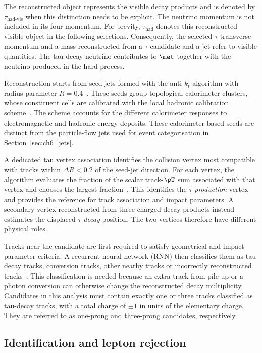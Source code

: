 The reconstructed object represents the visible decay products and is denoted by $\tau_{\mathrm{had\text{-}vis}}$ when this distinction needs to be explicit.
The neutrino momentum is not included in its four-momentum.
For brevity, $\tau_{\mathrm{had}}$ denotes this reconstructed visible object in the following selections.
Consequently, the selected $\tau$ transverse momentum and a mass reconstructed from a $\tau$ candidate and a jet refer to visible quantities.
The tau-decay neutrino contributes to $\met$ together with the neutrino produced in the hard process.

Reconstruction starts from seed jets formed with the anti-$k_t$ algorithm with radius parameter $R=0.4$~\cite{Cacciari2008AntiKt,ATLAS2022TauR22}.
These seeds group topological calorimeter clusters, whose constituent cells are calibrated with the local hadronic calibration scheme~\cite{ATLAS2017TopoClusters}.
The scheme accounts for the different calorimeter responses to electromagnetic and hadronic energy deposits.
These calorimeter-based seeds are distinct from the particle-flow jets used for event categorisation in Section~\ref{sec:ch6_jets}.

A dedicated tau vertex association identifies the collision vertex most compatible with tracks within $\Delta R<0.2$ of the seed-jet direction.
For each vertex, the algorithm evaluates the fraction of the scalar track-$\pT$ sum associated with that vertex and chooses the largest fraction~\cite{ATLAS2022TauR22}.
This identifies the $\tau$ \emph{production} vertex and provides the reference for track association and impact parameters.
A secondary vertex reconstructed from three charged decay products instead estimates the displaced $\tau$ \emph{decay} position.
The two vertices therefore have different physical roles.

Tracks near the candidate are first required to satisfy geometrical and impact-parameter criteria.
A recurrent neural network (RNN) then classifies them as tau-decay tracks, conversion tracks, other nearby tracks or incorrectly reconstructed tracks~\cite{ATLAS2022TauR22}.
This classification is needed because an extra track from pile-up or a photon conversion can otherwise change the reconstructed decay multiplicity.
Candidates in this analysis must contain exactly one or three tracks classified as tau-decay tracks, with a total charge of $\pm1$ in units of the elementary charge.
They are referred to as one-prong and three-prong candidates, respectively.

\subsection{Identification and lepton rejection}

